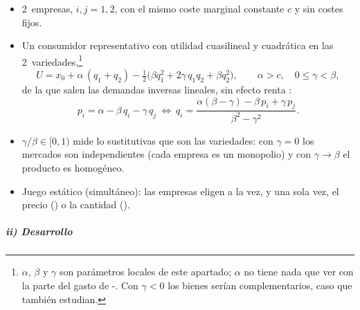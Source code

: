 \documentclass[11pt]{article}
\begin{document}
\begin{itemize}
\item 2~empresas, $i,j=1,2$, con el mismo coste marginal constante $c$ y sin costes fijos.
\item Un consumidor representativo con utilidad cuasilineal y cuadrática en las 2~variedades,\footnote{$\alpha$, $\beta$ y $\gamma$ son parámetros locales de este apartado; $\alpha$ no tiene nada que ver con la parte del gasto de -. Con $\gamma<0$ los bienes serían complementarios, caso que \textcite{SinghVives1984Price} también estudian.}
  $$U=x_0+\alpha\,(q_1+q_2)-\tfrac{1}{2}\big(\beta q_1^2+2\gamma\,q_1q_2+\beta q_2^2\big),\qquad \alpha>c,\quad 0\le\gamma<\beta,$$
  de la que salen las demandas inversas lineales, sin efecto renta :
  \begin{equation}\label{eq:singh-vives}
  p_i=\alpha-\beta\,q_i-\gamma\,q_j\ \Longleftrightarrow\ q_i=\frac{\alpha(\beta-\gamma)-\beta\,p_i+\gamma\,p_j}{\beta^2-\gamma^2}.
  \end{equation}
\item $\gamma/\beta\in[0,1)$ mide lo sustitutivas que son las variedades: con $\gamma=0$ los mercados son independientes (cada empresa es un monopolio) y con $\gamma\to\beta$ el producto es homogéneo.
\item Juego estático (simultáneo): las empresas eligen a la vez, y una sola vez, el precio () o la cantidad ().
\end{itemize}

\subparagraph{ii) Desarrollo}
\end{document}
